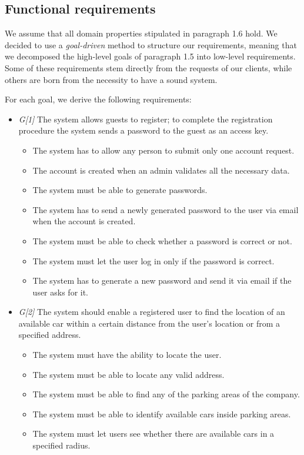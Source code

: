 
\subsection{Functional requirements}
We assume that all domain properties stipulated in paragraph 1.6 hold. We decided to use a \textit{goal-driven} method to structure our requirements, meaning that we decomposed the high-level goals of paragraph 1.5 into low-level requirements.
Some of these requirements stem directly from the requests of our clients, while others are born from the necessity to have a sound system.

For each goal, we derive the following requirements:



\begin{itemize}


				\item \textit{G[1]} The system allows guests to register; to complete the registration procedure the system sends a password to the guest as an access key.
					\begin{itemize}
						\item The system has to allow any person to submit only one account request.
						\item The account is created when an admin validates all the necessary data.
						\item The system must be able to generate passwords.
						\item The system has to send a newly generated password to the user via email when the account is created.
						\item The system must be able to check whether a password is correct or not.
						\item The system must let the user log in only if the password is correct. 
						\item The system has to generate a new password and send it via email if the user asks for it.
					\end{itemize}

				\item \textit{G[2]} The system should enable a registered user to find the location of an available car within a certain distance from the user's location or from a specified address.
					\begin{itemize}
						\item The system must have the ability to locate the user.
						\item The system must be able to locate any valid address.
						\item The system must be able to find any of the parking areas of the company. 
						\item The system must be able to identify available cars inside parking areas.
						\item The system must let users see whether there are available cars in a specified radius. %
					\end{itemize}
					

\end{itemize}
